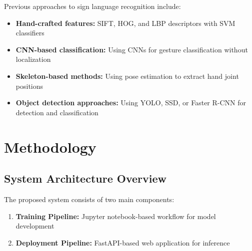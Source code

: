 \documentclass[12pt,a4paper]{article}
\begin{document}
Previous approaches to sign language recognition include:

\begin{itemize}
    \item \textbf{Hand-crafted features:} SIFT, HOG, and LBP descriptors with SVM classifiers
    \item \textbf{CNN-based classification:} Using CNNs for gesture classification without localization
    \item \textbf{Skeleton-based methods:} Using pose estimation to extract hand joint positions
    \item \textbf{Object detection approaches:} Using YOLO, SSD, or Faster R-CNN for detection and classification
\end{itemize}

\section{Methodology}

\subsection{System Architecture Overview}

The proposed system consists of two main components:

\begin{enumerate}
    \item \textbf{Training Pipeline:} Jupyter notebook-based workflow for model development
    \item \textbf{Deployment Pipeline:} FastAPI-based web application for inference
\end{enumerate}
\end{document}
